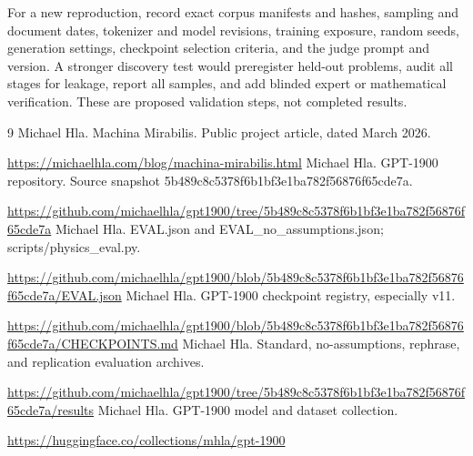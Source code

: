 \documentclass[10pt,a4paper]{article}
\begin{document}
For a new reproduction, record exact corpus manifests and hashes, sampling and document dates, tokenizer and model revisions, training exposure, random seeds, generation settings, checkpoint selection criteria, and the judge prompt and version. A stronger discovery test would preregister held-out problems, audit all stages for leakage, report all samples, and add blinded expert or mathematical verification. These are proposed validation steps, not completed results.

\begin{thebibliography}{9}
\small
{} Michael Hla. Machina Mirabilis. Public project article, dated March 2026.\par\url{https://michaelhla.com/blog/machina-mirabilis.html}
 Michael Hla. GPT-1900 repository. Source snapshot 5b489c8c5378f6b1bf3e1ba782f56876f65cde7a.\par\url{https://github.com/michaelhla/gpt1900/tree/5b489c8c5378f6b1bf3e1ba782f56876f65cde7a}
 Michael Hla. EVAL.json and EVAL\_no\_assumptions.json; scripts/physics\_eval.py.\par\url{https://github.com/michaelhla/gpt1900/blob/5b489c8c5378f6b1bf3e1ba782f56876f65cde7a/EVAL.json}
 Michael Hla. GPT-1900 checkpoint registry, especially v11.\par\url{https://github.com/michaelhla/gpt1900/blob/5b489c8c5378f6b1bf3e1ba782f56876f65cde7a/CHECKPOINTS.md}
 Michael Hla. Standard, no-assumptions, rephrase, and replication evaluation archives.\par\url{https://github.com/michaelhla/gpt1900/tree/5b489c8c5378f6b1bf3e1ba782f56876f65cde7a/results}
 Michael Hla. GPT-1900 model and dataset collection.\par\url{https://huggingface.co/collections/mhla/gpt-1900}
\end{thebibliography}
\end{document}
